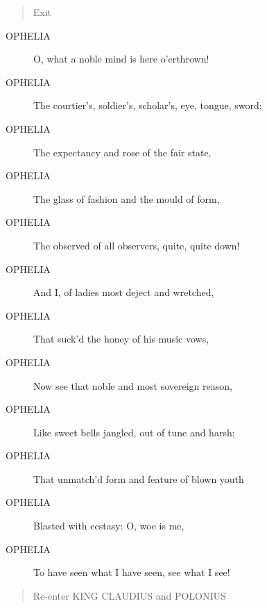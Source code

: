 \documentclass{article}
\begin{document}
\begin{quote}
Exit
\end{quote}
          
\begin{description}
            
\item[OPHELIA] O, what a noble mind is here o'erthrown!
\item[OPHELIA] The courtier's, soldier's, scholar's, eye, tongue, sword;
\item[OPHELIA] The expectancy and rose of the fair state,
\item[OPHELIA] The glass of fashion and the mould of form,
\item[OPHELIA] The observed of all observers, quite, quite down!
\item[OPHELIA] And I, of ladies most deject and wretched,
\item[OPHELIA] That suck'd the honey of his music vows,
\item[OPHELIA] Now see that noble and most sovereign reason,
\item[OPHELIA] Like sweet bells jangled, out of tune and harsh;
\item[OPHELIA] That unmatch'd form and feature of blown youth
\item[OPHELIA] Blasted with ecstasy: O, woe is me,
\item[OPHELIA] To have seen what I have seen, see what I see!
\end{description}
          
\begin{quote}
Re-enter KING CLAUDIUS and POLONIUS
\end{quote}
          
\end{document}

